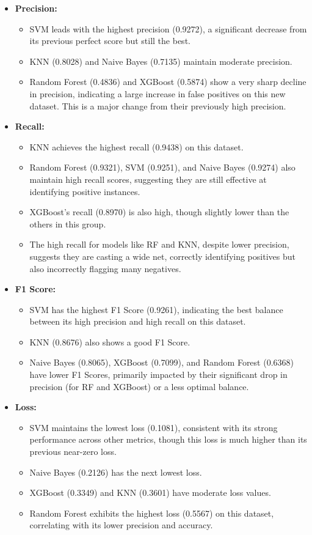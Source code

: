 \begin{itemize}
    \item \textbf{Precision:}
    \begin{itemize}
        \item SVM leads with the highest precision (0.9272), a significant decrease from its previous perfect score but still the best.
        \item KNN (0.8028) and Naive Bayes (0.7135) maintain moderate precision.
        \item Random Forest (0.4836) and XGBoost (0.5874) show a very sharp decline in precision, indicating a large increase in false positives on this new dataset. This is a major change from their previously high precision.
    \end{itemize}

    \item \textbf{Recall:}
    \begin{itemize}
        \item KNN achieves the highest recall (0.9438) on this dataset.
        \item Random Forest (0.9321), SVM (0.9251), and Naive Bayes (0.9274) also maintain high recall scores, suggesting they are still effective at identifying positive instances.
        \item XGBoost's recall (0.8970) is also high, though slightly lower than the others in this group.
        \item The high recall for models like RF and KNN, despite lower precision, suggests they are casting a wide net, correctly identifying positives but also incorrectly flagging many negatives.
    \end{itemize}

    \item \textbf{F1 Score:}
    \begin{itemize}
        \item SVM has the highest F1 Score (0.9261), indicating the best balance between its high precision and high recall on this dataset.
        \item KNN (0.8676) also shows a good F1 Score.
        \item Naive Bayes (0.8065), XGBoost (0.7099), and Random Forest (0.6368) have lower F1 Scores, primarily impacted by their significant drop in precision (for RF and XGBoost) or a less optimal balance.
    \end{itemize}

    \item \textbf{Loss:}
    \begin{itemize}
        \item SVM maintains the lowest loss (0.1081), consistent with its strong performance across other metrics, though this loss is much higher than its previous near-zero loss.
        \item Naive Bayes (0.2126) has the next lowest loss.
        \item XGBoost (0.3349) and KNN (0.3601) have moderate loss values.
        \item Random Forest exhibits the highest loss (0.5567) on this dataset, correlating with its lower precision and accuracy.
    \end{itemize}


\end{itemize}
